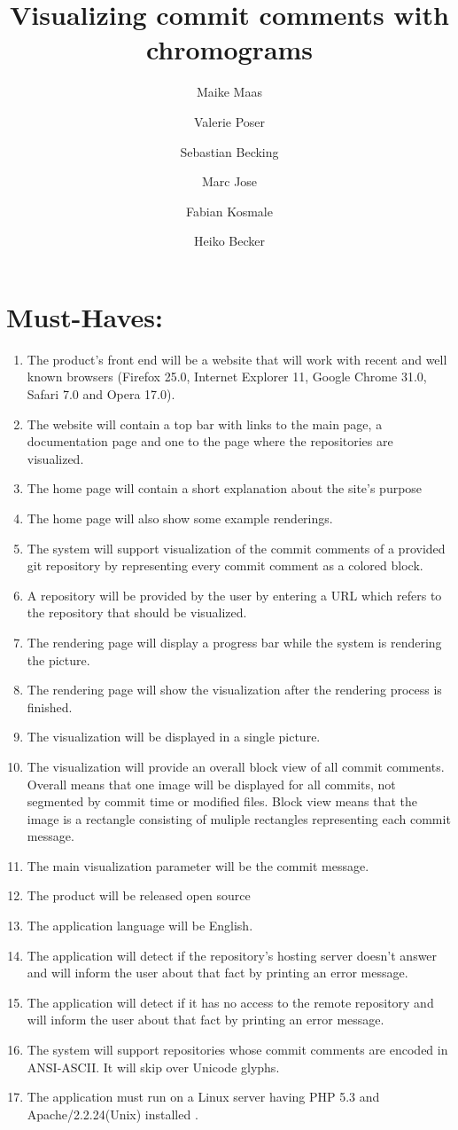 \documentclass[12pt]{scrartcl}
\author{Maike Maas \and Valerie Poser \and Sebastian Becking
\and Marc Jose \and Fabian Kosmale  \and Heiko Becker}
\title{Visualizing commit comments with chromograms}
\begin{document}
\maketitle
\section{Must-Haves:}
\begin{enumerate}
\item The product's front end will be a website that will work with recent and well known browsers (Firefox 25.0, Internet Explorer 11, Google Chrome 31.0, Safari 7.0 and Opera 17.0). 
\item The website will contain a top bar with links to the main page, a documentation page and one to the page where the repositories are visualized. 
\item The home page will contain a short explanation about the site's purpose
\item The home page will also show some example renderings.
\item The system will support visualization of the commit comments of a provided git repository by representing every commit comment as a colored block.
\item A repository will be provided by the user by entering a URL which refers to the repository that should be visualized.
\item The rendering page will display a progress bar while the system is rendering the picture.
\item The rendering page will show the visualization after the rendering process is finished.
\item The visualization will be displayed in a single picture.
\item The visualization will provide an overall block view of all commit
	comments. Overall means that one image will be displayed for all
	commits, not segmented by commit time or modified files. Block view means
	that the image is a rectangle consisting of muliple rectangles
	representing each commit message.
\item The main visualization parameter will be the commit message.
\item The product will be released open source 
\item The application language will be English.
\item The application will detect if the repository's hosting server doesn't answer and will inform the user about that fact by printing an error message.
\item The application will detect if it has no access to the remote repository and will inform the user about that fact by printing an error message.
\item The system will support repositories whose commit comments are encoded in
	ANSI-ASCII. It will skip over Unicode glyphs.
\item The application must run on a Linux server having PHP 5.3 and
	Apache/2.2.24(Unix) installed .
\end{enumerate}
\end{document}
